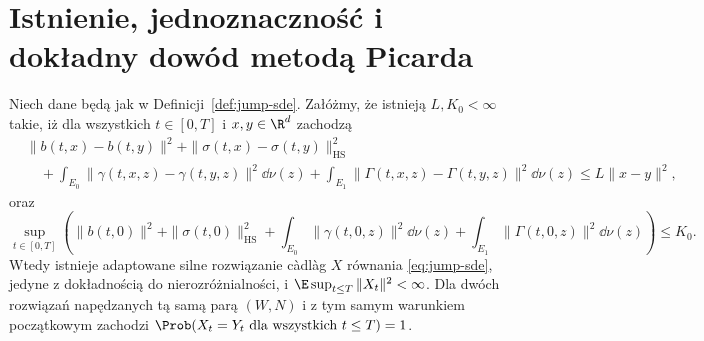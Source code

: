 \section{Istnienie, jednoznaczność i dokładny dowód metodą Picarda}

\begin{twierdzenie}
\label{th:jump-picard}
Niech dane będą jak w Definicji~\ref{def:jump-sde}.
Załóżmy, że istnieją $L,K_0<\infty$ takie, iż dla wszystkich
$t\in[0,T]$ i $x,y\in\R^d$ zachodzą
\[
\begin{split}
&\|b(t,x)-b(t,y)\|^2+
 \|\sigma(t,x)-\sigma(t,y)\|_{\mathrm{HS}}^2\\
&\quad+\int_{E_0}\|\gamma(t,x,z)-\gamma(t,y,z)\|^2\dd\nu(z)
 +\int_{E_1}\|\Gamma(t,x,z)-\Gamma(t,y,z)\|^2\dd\nu(z)
 \le L\|x-y\|^2,
\end{split}
\tag{13.3}\label{eq:jump-lip}
\]
oraz
\[
\sup_{t\in[0,T]}\left(
\|b(t,0)\|^2+\|\sigma(t,0)\|_{\mathrm{HS}}^2
+\int_{E_0}\|\gamma(t,0,z)\|^2\dd\nu(z)
+\int_{E_1}\|\Gamma(t,0,z)\|^2\dd\nu(z)
\right)\le K_0.
\tag{13.4}\label{eq:jump-at-zero}
\]
Wtedy istnieje adaptowane silne rozwiązanie càdlàg $X$
równania \eqref{eq:jump-sde}, jedyne z dokładnością
do nierozróżnialności, i
$\E\sup_{t\le T}\|X_t\|^2<\infty$.
Dla dwóch rozwiązań napędzanych tą samą parą $(W,N)$
i z tym samym warunkiem początkowym zachodzi
$\Prob(X_t=Y_t\ \text{dla wszystkich }t\le T)=1$.
\end{twierdzenie}
